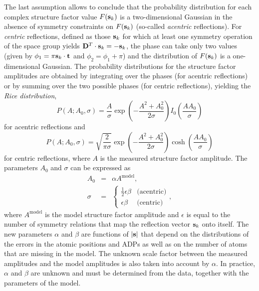 \documentclass[12pt]{article}
\newcommand{\vect}[1]{{\bf #1}}
\newcommand{\mat}[1]{{\bf #1}}
\newcommand{\vs}{\vect{s}}
\newcommand{\vt}{\vect{t}}
\begin{document}
\begin{sloppy}
The last assumption allows to conclude that the probability
distribution for each complex structure factor value $F(\vs_k)$ is a
two-dimensional Gaussian in the absence of symmetry constraints on
$F(\vs_k)$ (so-called \textit{acentric} reflections). For
\textit{centric} reflections, defined as those $\vs_k$ for which at
least one symmetry operation of the space group yields
$\mat{D}^T\cdot\vs_k = -\vs_k$, the phase can take only two values
(given by $\phi_1 = \pi \vs_k\cdot\vt$ and $\phi_2 = \phi_1+\pi$) and
the distribution of $F(\vs_k)$ is a one-dimensional Gaussian.
The probability distributions for the structure factor amplitudes
are obtained by integrating over the phases (for acentric reflections)
or by summing over the two possible phases (for centric reflections),
yielding the \textit{Rice distribution},
\begin{equation}
P(A; A_0, \sigma) = \frac{A}{\sigma}
                      \exp\left(-\frac{A^2+A_0^2}{2\sigma}\right)
                      I_0\left(\frac{A A_0}{\sigma}\right)
\end{equation}
for acentric reflections and
\begin{equation}
P(A; A_0, \sigma) = \sqrt{\frac{2}{\pi\sigma}}
                      \exp\left(-\frac{A^2+A_0^2}{2\sigma}\right)
                      \cosh\left(\frac{A A_0}{\sigma}\right)
\end{equation}
for centric reflections, where $A$ is the measured structure factor
amplitude. The parameters $A_0$ and $\sigma$ can be expressed as
\begin{eqnarray}
A_0 &=& \alpha A^{\mbox{model}}, \\
\sigma &=& \left\{
  \begin{array}{cl}
    \frac{1}{2} \epsilon \beta & \mbox{(acentric)} \\
    \epsilon \beta &\mbox{(centric)}
  \end{array}
\right. ,
\end{eqnarray}
where $A^{\mbox{model}}$ is the model structure factor amplitude and
$\epsilon$ is equal to the number of symmetry relations that map the
reflection vector $\vs_k$ onto itself. The new parameters $\alpha$ and
$\beta$ are functions of $|\vs|$ that depend on the distributions of
the errors in the atomic positions and ADPs as well as on the number
of atoms that are missing in the model. The unknown scale factor
between the measured amplitudes and the model amplitudes is also taken
into account by $\alpha$. In practice, $\alpha$ and $\beta$ are
unknown and must be determined from the data, together with the
parameters of the model.


\end{sloppy}
\end{document}
